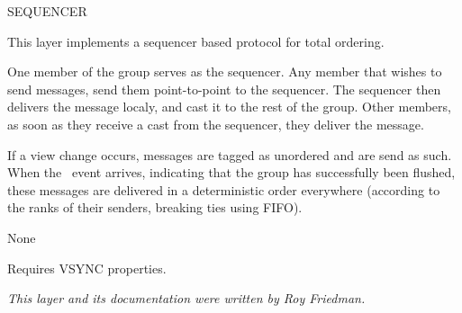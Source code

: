 \begin{Layer}{SEQUENCER}

This layer implements a sequencer based protocol for total ordering.

\begin{Protocol}
One member of the group serves as the sequencer. Any member that wishes to
send messages, send them point-to-point to the sequencer. The sequencer then
delivers the message localy, and cast it to the rest of the group. Other
members, as soon as they receive a cast from the sequencer, they deliver
the message.

If a view change occurs, messages are tagged as unordered and are send as
such.
When the \UpView\ event arrives, indicating that the group has successfully
been flushed, these messages are delivered in a deterministic order everywhere
(according to the ranks of their senders, breaking ties using FIFO).
\end{Protocol}

\begin{Parameters}
\item None
\end{Parameters}

\begin{Properties}
\item
Requires VSYNC properties.
\end{Properties}

\begin{Sources}
\end{Sources}

\begin{GenEvent}
\genevent{\DnAck}
\genevent{\DnCast}
\genevent{\DnSend}
\end{GenEvent}

\begin{Testing}
\item
\todo{}
\end{Testing}

\emph{This layer and its documentation were written by Roy Friedman.}
\end{Layer}
